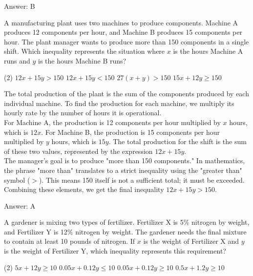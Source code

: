 \documentclass[11pt,paper=a4,answers]{exam}
\begin{document}
\begin{questions}
\begin{solution}
\vspace{15pt}
Answer: \colorbox{yellow!100}{B}
\end{solution}

\question
A manufacturing plant uses two machines to produce components. Machine A produces 12 components per hour, and Machine B produces 15 components per hour. The plant manager wants to produce more than 150 components in a single shift. Which inequality represents the situation where $x$ is the hours Machine A runs and $y$ is the hours Machine B runs?
\begin{tasks}(2)
    \task $12x + 15y > 150$
    \task $12x + 15y < 150$
    \task $27(x + y) > 150$
    \task $15x + 12y \geq 150$
\end{tasks}

\begin{solution}
The total production of the plant is the sum of the components produced by each individual machine. To find the production for each machine, we multiply its hourly rate by the number of hours it is operational.
\\[10pt]
For Machine A, the production is 12 components per hour multiplied by $x$ hours, which is $12x$. For Machine B, the production is 15 components per hour multiplied by $y$ hours, which is $15y$. The total production for the shift is the sum of these two values, represented by the expression $12x + 15y$.
\\[10pt]
The manager's goal is to produce "more than 150 components." In mathematics, the phrase "more than" translates to a strict inequality using the "greater than" symbol ($>$). This means 150 itself is not a sufficient total; it must be exceeded. Combining these elements, we get the final inequality $12x + 15y > 150$.

\vspace{15pt}
Answer: \colorbox{yellow!100}{A}
\end{solution}

\question
A gardener is mixing two types of fertilizer. Fertilizer X is 5\% nitrogen by weight, and Fertilizer Y is 12\% nitrogen by weight. The gardener needs the final mixture to contain at least 10 pounds of nitrogen. If $x$ is the weight of Fertilizer X and $y$ is the weight of Fertilizer Y, which inequality represents this requirement?
\begin{tasks}(2)
    \task $5x + 12y \geq 10$
    \task $0.05x + 0.12y \leq 10$
    \task $0.05x + 0.12y \geq 10$
    \task $0.5x + 1.2y \geq 10$
\end{tasks}


\end{questions}
\end{document}
